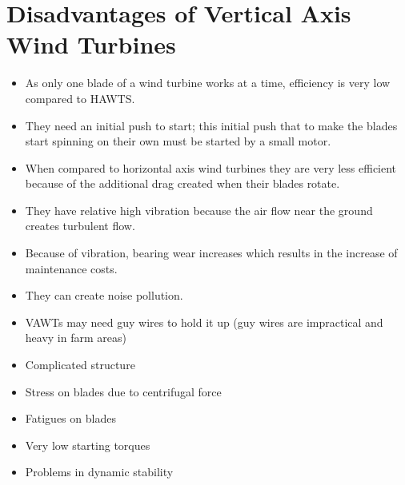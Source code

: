 \documentclass[12pt,a4paper]{article}
\begin{document}
\section{Disadvantages of Vertical Axis Wind Turbines}
\begin{itemize}
\item As only one blade of a wind turbine works at a time, efficiency is very low compared to HAWTS.
\item They need an initial push to start; this initial push that to make the blades start spinning on their own must be started by a small motor.
\item When compared to horizontal axis wind turbines they are very less efficient because of the additional drag created when their blades rotate.
\item They have relative high vibration because the air flow near the ground creates turbulent flow.
\item Because of vibration, bearing wear increases which results in the increase of maintenance costs.
\item They can create noise pollution.
\item VAWTs may need guy wires to hold it up (guy wires are impractical and heavy in farm areas)
\item Complicated structure
\item Stress on blades due to centrifugal force
\item Fatigues on blades
\item Very low starting torques
\item Problems in dynamic stability
\end{itemize}




% 
\end{document}
